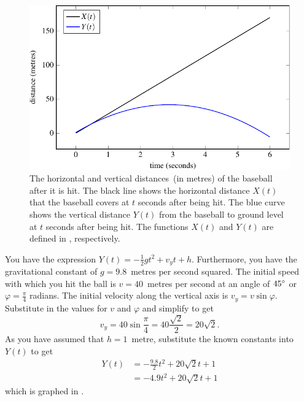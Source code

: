\documentclass[a4paper,oneside,12pt]{article}
\begin{document}
\begin{problem}
{\begin{solution}
\begin{figure}[!htbp]
\centering
\includegraphics[scale=1.1]{image/13/baseball-x-y-displacement.pdf}
\caption{%
  The horizontal and vertical distances~(in metres) of the baseball
  after it is hit.  The black line shows the horizontal distance
  $X(t)$ that the baseball covers at $t$ seconds after being hit.  The
  blue curve shows the vertical distance $Y(t)$ from the baseball to
  ground level at $t$ seconds after being hit.  The functions $X(t)$
  and $Y(t)$ are defined in
  ,
  respectively.
}
\label{fig:trigonometric:baseball_x_y_displacement}
\end{figure}

You have the expression $Y(t) = -\frac{1}{2} g t^2 + v_y t + h$.
Furthermore, you have the gravitational constant of $g = 9.8$~metres
per second squared.  The initial speed with which you hit the ball is
$v = 40$~metres per second at an angle of ${45}^{\circ}$ or
$\varphi = \frac{\pi}{4}$ radians.  The initial velocity along the
vertical axis is $v_y = v \sin\varphi$.  Substitute in the values for
$v$ and $\varphi$ and simplify to get
\[
v_y
=
40 \sin\frac{\pi}{4}
=
40 \frac{\sqrt{2}}{2}
=
20 \sqrt{2}.
\]
As you have assumed that $h = 1$~metre, substitute the known constants
into $Y(t)$ to get
\begin{equation}
\label{eqn:trigonometric:baseball_y_displacement}
\begin{aligned}
Y(t)
&=
-\frac{9.8}{2} t^2 + 20\sqrt{2} t + 1 \\[4pt]
&=
-4.9 t^2 + 20 \sqrt{2} t + 1
\end{aligned}
\end{equation}
which is graphed in
.


\end{solution}}
\end{problem}
\end{document}

